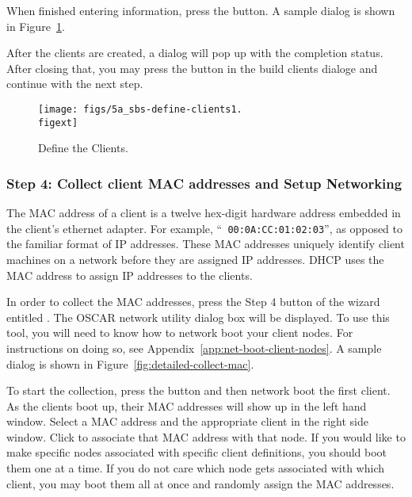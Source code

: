 When finished entering information, press the  button.
A sample dialog is shown in Figure~\ref{fig:detailed-define-clients}. 

After the clients are created, a dialog will pop up with the
completion status. After closing that, you may press the
 button in the build clients dialoge and continue with
the next step.

\begin{figure}[htbp]
  \begin{center}
    \texttt{[image: figs/5a\_sbs-define-clients1.\\figext]}
    \caption{Define the Clients.}
    \label{fig:detailed-define-clients}
  \end{center}
\end{figure}
    

\subsubsection{Step 4: Collect client MAC addresses and Setup Networking} 
\label{det:setupnetwork}

The MAC address of a client is a twelve hex-digit hardware address
embedded in the client's ethernet adapter. For example, ``{\tt
  00:0A:CC:01:02:03}'', as opposed to the familiar format of IP
addresses.  These MAC addresses uniquely identify client machines on a
network before they are assigned IP addresses. DHCP uses the MAC
address to assign IP addresses to the clients.

In order to collect the MAC addresses, press the Step 4 button of the
wizard entitled . The OSCAR network utility
dialog box will be displayed.  To use this tool, you will need to know
how to network boot your client nodes.  For instructions on doing so,
see Appendix~\ref{app:net-boot-client-nodes}. A sample dialog is shown
in Figure~\ref{fig:detailed-collect-mac}.

To start the collection, press the  button
and then network boot the first client.  As the clients boot up, their
MAC addresses will show up in the left hand window. Select a MAC
address and the appropriate client in the right side window. Click
 to associate that MAC address with that
node. If you would like to make specific nodes associated with
specific client definitions, you should boot them one at a time. If
you do not care which node gets associated with which client, you may
boot them all at once and randomly assign the MAC addresses.

